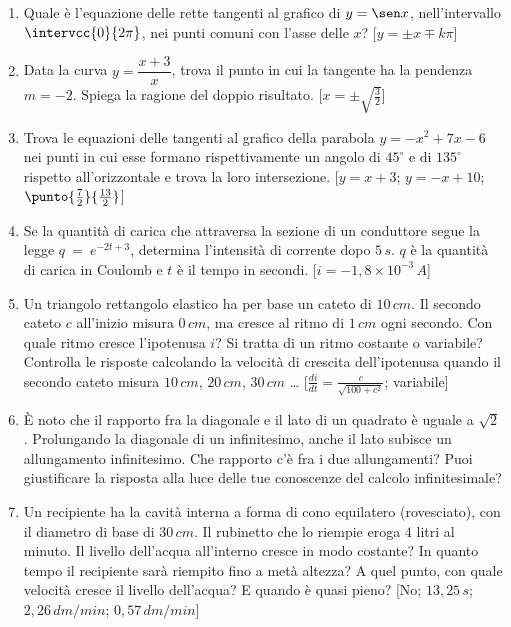 \begin{enumerate}
\item Quale è l'equazione delle rette tangenti al grafico di $y=\sen x$, 
nell'intervallo $\intervcc{0}{2\pi}$, nei punti comuni con l'asse delle $x$?
 \hfill[$y=\pm x\mp k\pi$]

\item Data la curva $y=\dfrac{x+3}{x}$, trova il punto in cui la tangente ha 
la pendenza $m=-2$. Spiega la ragione del doppio risultato.
\hfill [$x=\pm\sqrt{\frac{3}{2}}$]

\item  Trova le equazioni delle tangenti al grafico della parabola 
$y=-x^2+7x-6$ nei punti in cui esse formano rispettivamente un angolo di 
$45^\circ$ e di $135^\circ$ rispetto all'orizzontale e trova la loro 
intersezione.
 \hfill [$y=x+3$; $y=-x+10$; $\punto{\frac{7}{2}}{\frac{13}{2}}$]

\item Se la quantità di carica che attraversa la sezione di un conduttore
segue la legge $q~=~e^{-2t+3}$,  determina 
l'intensità di corrente dopo $5\,s$.
$q$ è la quantità di carica in Coulomb e $t$ è il tempo in secondi.
\hfill [$i=-1,8\times 10^{-3}\, A$]

\item Un triangolo rettangolo elastico ha per base un cateto di $10\, cm$.
Il secondo cateto $c$ all'inizio misura $0\, cm$, ma cresce al ritmo di 
$1\, cm$ ogni secondo. Con quale ritmo cresce l'ipotenusa $i$?
Si tratta di un ritmo costante o variabile?
Controlla le risposte calcolando la velocità di crescita dell'ipotenusa quando 
il secondo cateto misura $10\, cm$, $20\, cm$, $30\, cm$ \dots
\hfill [$\frac{di}{dt}=\frac{c}{\sqrt{100+c^2}}$; variabile]

\item È noto che il rapporto fra la diagonale e il lato di un quadrato è uguale 
a $\sqrt{2}$. Prolungando la diagonale di un infinitesimo, anche il lato 
subisce un allungamento infinitesimo. Che rapporto c'è fra i due allungamenti?
Puoi giustificare la risposta alla luce delle tue conoscenze del calcolo 
infinitesimale?

\item Un recipiente ha la cavità interna a forma di cono equilatero 
(rovesciato), con il diametro di base di $30\, cm$. Il rubinetto che lo riempie
eroga $4$ litri al minuto. Il livello dell'acqua all'interno cresce in modo 
costante? In quanto tempo il recipiente sarà riempito fino a metà altezza?
A quel punto, con quale velocità cresce il livello dell'acqua?
E quando è quasi pieno?
\hfill [No; $13,25\, s$; $2,26\, dm/min$; $0,57\, dm/min$]


\end{enumerate}
